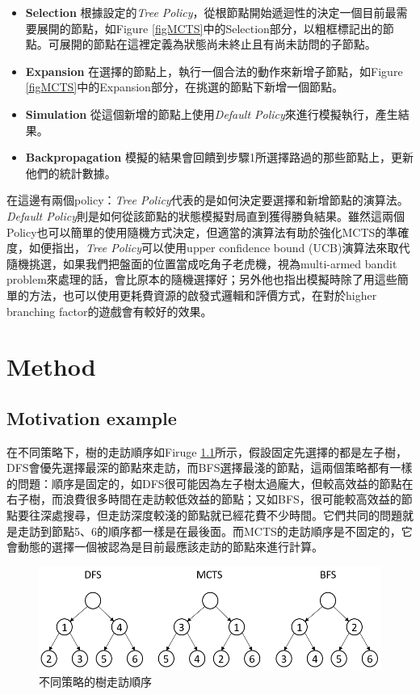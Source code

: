 \documentclass[12pt,a4paper,oneside]{book}
\begin{document}
\begin{itemize}
\item \textbf{Selection} 根據設定的\textit{Tree Policy}，從根節點開始遞迴性的決定一個目前最需要展開的節點，如Figure \ref{figMCTS}中的Selection部分，以粗框標記出的節點。可展開的節點在這裡定義為狀態尚未終止且有尚未訪問的子節點。
\item \textbf{Expansion} 在選擇的節點上，執行一個合法的動作來新增子節點，如Figure \ref{figMCTS}中的Expansion部分，在挑選的節點下新增一個節點。
\item \textbf{Simulation} 從這個新增的節點上使用\textit{Default Policy}來進行模擬執行，產生結果。
\item \textbf{Backpropagation} 模擬的結果會回饋到步驟1所選擇路過的那些節點上，更新他們的統計數據。
\end{itemize}

在這邊有兩個policy：\textit{Tree Policy}代表的是如何決定要選擇和新增節點的演算法。\textit{Default Policy}則是如何從該節點的狀態模擬對局直到獲得勝負結果。雖然這兩個Policy也可以簡單的使用隨機方式決定，但適當的演算法有助於強化MCTS的準確度，如\cite{Intro2MCTS}便指出，\textit{Tree Policy}可以使用upper confidence bound (UCB)演算法來取代隨機挑選，如果我們把盤面的位置當成吃角子老虎機，視為multi-armed bandit problem來處理的話，會比原本的隨機選擇好；另外他也指出模擬時除了用這些簡單的方法，也可以使用更耗費資源的啟發式邏輯和評價方式，在對於higher branching factor的遊戲會有較好的效果。

\chapter{Method}

\section{Motivation example}

在不同策略下，樹的走訪順序如Firuge \ref{figST}所示，假設固定先選擇的都是左子樹，DFS會優先選擇最深的節點來走訪，而BFS選擇最淺的節點，這兩個策略都有一樣的問題：順序是固定的，如DFS很可能因為左子樹太過龐大，但較高效益的節點在右子樹，而浪費很多時間在走訪較低效益的節點；又如BFS，很可能較高效益的節點要往深處搜尋，但走訪深度較淺的節點就已經花費不少時間。它們共同的問題就是走訪到節點5、6的順序都一樣是在最後面。而MCTS的走訪順序是不固定的，它會動態的選擇一個被認為是目前最應該走訪的節點來進行計算。

\begin{figure}[htbp]
\center
\includegraphics[width=\textwidth]{figures/strategy.PNG}
\caption{不同策略的樹走訪順序 \label{figST}}
\end{figure}
\end{document}

